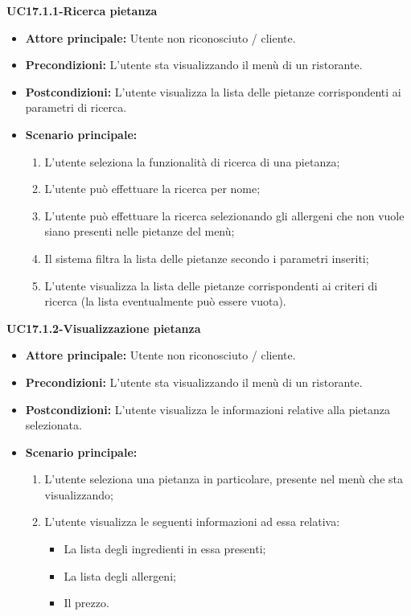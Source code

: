 \textbf{UC17.1.1-Ricerca pietanza}
\begin{itemize}
\item \textbf{Attore principale:} Utente non riconosciuto / cliente.
\item \textbf{Precondizioni:} L'utente sta visualizzando il menù di un ristorante.
\item \textbf{Postcondizioni:} L'utente visualizza la lista delle pietanze corrispondenti ai parametri di ricerca.
\item \textbf{Scenario principale:}
\begin{enumerate}
    \item L'utente seleziona la funzionalità di ricerca di una pietanza;
    \item L'utente può effettuare la ricerca per nome;
    \item L'utente può effettuare la ricerca selezionando gli allergeni che non vuole
    siano presenti nelle pietanze del menù;
    \item Il sistema filtra la lista delle pietanze secondo i parametri inseriti;
    \item L'utente visualizza la lista delle pietanze corrispondenti ai criteri di ricerca
    (la lista eventualmente può essere vuota).
\end{enumerate}
\end{itemize}

\textbf{UC17.1.2-Visualizzazione pietanza}
\begin{itemize}
\item \textbf{Attore principale:} Utente non riconosciuto / cliente.
\item \textbf{Precondizioni:} L'utente sta visualizzando il menù di un ristorante.
\item \textbf{Postcondizioni:} L'utente visualizza le informazioni relative alla pietanza selezionata.
\item \textbf{Scenario principale:}
\begin{enumerate}
    \item L'utente seleziona una pietanza in particolare, presente nel menù che sta visualizzando;
    \item L'utente visualizza le seguenti informazioni ad essa relativa:
    \begin{itemize}
        \item La lista degli ingredienti in essa presenti;
        \item La lista degli allergeni;
        \item Il prezzo.
    \end{itemize}
\end{enumerate}
\end{itemize}

